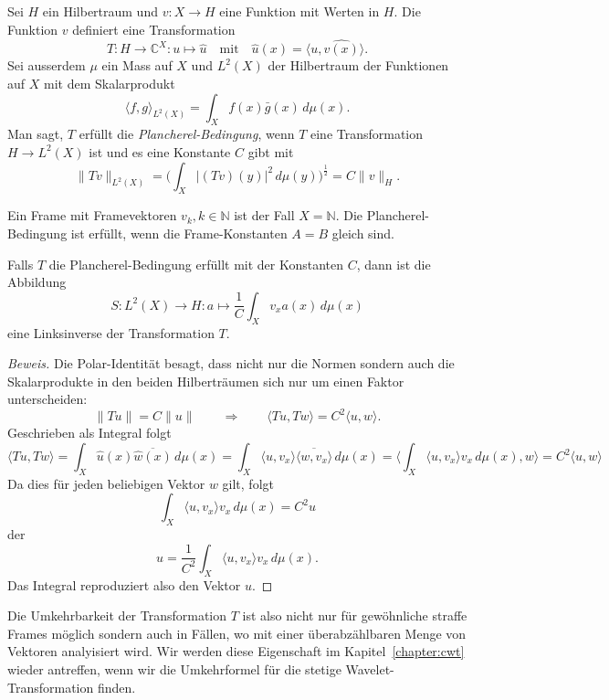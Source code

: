 \begin{definition}
Sei $H$ ein Hilbertraum und
$v\colon X\to H$ eine Funktion mit Werten in $H$.
Die Funktion $v$ definiert eine Transformation
\[
T\colon  H \to \mathbb C^X : u \mapsto \hat{u}
\quad\text{mit}\quad
\hat{u}(x) = \langle u,\hat{v(x)}\rangle.
\]
Sei ausserdem $\mu$ ein Mass auf $X$ und $L^2(X)$ der Hilbertraum
der Funktionen auf $X$ mit dem Skalarprodukt
\[
\langle f,g\rangle_{L^2(X)} = \int_X f(x) \bar{g}(x)\,d\mu(x).
\]
Man sagt, $T$ erfüllt die {\em Plancherel-Bedingung}, wenn $T$
%
eine Transformation $H\to L^2(X)$ ist und es eine Konstante $C$
gibt mit
\[
\| Tv \|_{L^2(X)}
=
\biggl(
\int_{X} |(Tv)(y)|^2 \, d\mu(y)
\biggr)^{\frac12}
=
C \|v\|_H.
\]
\end{definition}

Ein Frame mit Framevektoren $v_k, k\in\mathbb N$ 
ist der Fall $X=\mathbb N$. Die Plancherel-Bedingung ist erfüllt, wenn
die Frame-Konstanten $A=B$ gleich sind.

\begin{satz}
\label{satz:plancherel-prinzip}
Falls $T$ die Plancherel-Bedingung erfüllt mit der Konstanten $C$, dann ist
die Abbildung
\[
S
\colon
L^2(X) \to H
:
a \mapsto \frac{1}{C}\int_X v_x a(x) \,d\mu(x)
\]
eine Linksinverse der Transformation $T$.
\end{satz}

\begin{proof}[Beweis]
Die Polar-Identität besagt, dass nicht nur die Normen sondern auch die
Skalarprodukte in den beiden Hilberträumen sich nur um einen Faktor
unterscheiden:
\[
\| Tu \| = C \| u \|
\qquad\Rightarrow\qquad
\langle Tu,Tw\rangle = C^2 \langle u,w\rangle.
\]
Geschrieben als Integral folgt
\[
\langle Tu,Tw\rangle
=
\int_X \hat{u}(x) \overline{\hat{w}(x)} \,d\mu(x)
=
\int_X \langle u,v_x\rangle \overline{\langle w,v_x\rangle}\,d\mu(x)
=
\biggl\langle
\int_X \langle u,v_x\rangle v_x\,d\mu(x),
w
\biggr\rangle
=
C^2
\langle u,w\rangle
\]
Da dies für jeden beliebigen Vektor $w$ gilt, folgt 
\[
\int_X \langle u,v_x\rangle v_x\,d\mu(x) = C^2 u
\]
der
\[
u = \frac{1}{C^2}\int_X \langle u,v_x\rangle v_x\,d\mu(x).
\]
Das Integral reproduziert also den Vektor $u$.
\end{proof}

Die Umkehrbarkeit der Transformation $T$ ist also nicht nur für gewöhnliche
straffe Frames möglich sondern auch in Fällen, wo mit einer überabzählbaren
Menge von Vektoren analyisiert wird.
Wir werden diese Eigenschaft im Kapitel~\ref{chapter:cwt} wieder antreffen,
wenn wir die Umkehrformel für die stetige Wavelet-Transformation finden.






